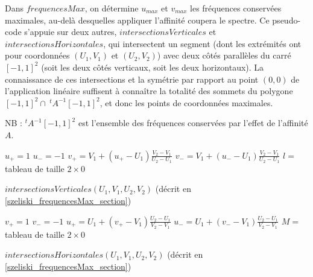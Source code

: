   Dans $frequencesMax$, on détermine $u_{max}$ et $v_{max}$ les fréquences conservées maximales, au-delà desquelles appliquer l'affinité coupera le spectre. Ce pseudo-code s'appuie sur deux autres, $intersectionsVerticales$ et $intersectionsHorizontales$, qui intersectent un segment (dont les extrémités ont pour coordonnées $(U_1,V_1)$ et $(U_2,V_2)$) avec deux côtés parallèles du carré $[-1,1]^2$ (soit les deux côtés verticaux, soit les deux horizontaux). La connaissance de ces intersections et la symétrie par rapport au point $(0,0)$ de l'application linéaire suffisent à connaître la totalité des sommets du polygone $[-1,1]^2 \cap \ ^t\!\!A^{-1}[-1,1]^2$, et donc les points de coordonnées maximales.
  
  NB : $^t\!\!A^{-1}[-1,1]^2$ est l'ensemble des fréquences conservées par l'effet de l'affinité $A$.
  
  \begin{algorithme}
   $u_+ = 1$\;
   $u_- = -1$\;
   $v_+ = V_1+(u_+-U_1)\frac{V_2-V_1}{U_2-U_1}$\;
   $v_- = V_1+(u_--U_1)\frac{V_2-V_1}{U_2-U_1}$\;
   $l =$ tableau de taille $2 \times 0$\;
   \caption{$intersectionsVerticales(U_1,V_1,U_2,V_2)$ (décrit en \ref{szeliski_frequencesMax_section})}
   \label{szeliski_intersectionsVerticales}
  \end{algorithme}










  \begin{algorithme}
   $v_+ = 1$\;
   $v_- = -1$\;
   $u_+ = U_1+(v_+-V_1)\frac{U_2-U_1}{V_2-V_1}$\;
   $u_- = U_1+(v_--V_1)\frac{U_2-U_1}{V_2-V_1}$\;
   $M =$ tableau de taille $2 \times 0$\;
   \caption{$intersectionsHorizontales(U_1,V_1,U_2,V_2)$ (décrit en \ref{szeliski_frequencesMax_section})}
   \label{szeliski_intersectionsHorizontales}
  \end{algorithme}










